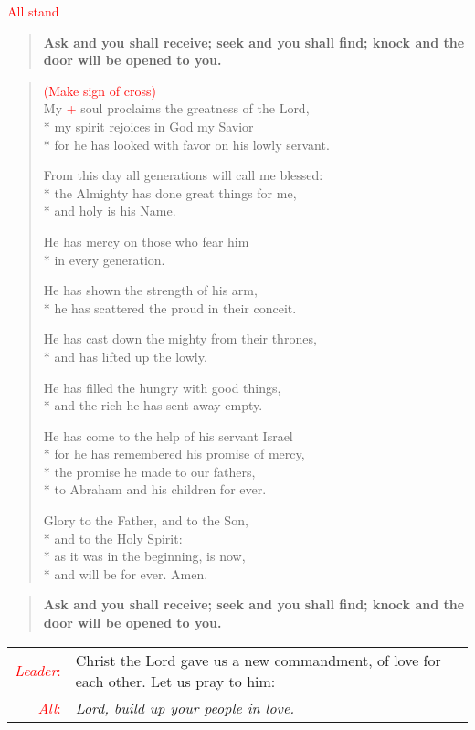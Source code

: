 \documentclass[letterpaper,14pt]{extarticle}
\newcommand{\side}[1]{\flagverse{\textcolor{red}{\textit{#1}}:}}
\newcommand{\sidestar}[1]{\textcolor{red}{\textit{#1}:}}
\newcommand{\rednote}[1]{\textcolor{red}{#1}}
\newlength{\oldindent}
\newcommand{\antiphon}[2]{
	\setlength{\oldindent}{\vindent}
	\setlength{\vindent}{0em}
	\begin{verse}
	\side{#1} \textbf{#2}
	\end{verse}
	\setlength{\vindent}{\oldindent}
}
\newcommand{\intercession}[2]{
	\begin{tabular}[h]{r p{4.25in}}
		\sidestar{Leader} & #1 \\
		\sidestar{All} & #2
	\end{tabular}}
\begin{document}
\rednote{All stand}
\antiphon{Leader}{Ask and you shall receive; seek and you shall find; knock and the door will be opened to you.}
\begin{verse}
\rednote{(Make sign of cross)}\\
\side{All} My \rednote{+} soul proclaims the greatness of the Lord, \\*
my spirit rejoices in God my Savior \\*
for he has looked with favor on his lowly servant.

From this day all generations will call me blessed: \\*
the Almighty has done great things for me, \\*
and holy is his Name.

He has mercy on those who fear him \\*
in every generation.

He has shown the strength of his arm, \\*
he has scattered the proud in their conceit.

He has cast down the mighty from their thrones, \\*
and has lifted up the lowly.

He has filled the hungry with good things, \\*
and the rich he has sent away empty.

He has come to the help of his servant Israel \\*
for he has remembered his promise of mercy, \\*
the promise he made to our fathers, \\*
to Abraham and his children for ever.

Glory to the Father, and to the Son, \\*
and to the Holy Spirit: \\*
as it was in the beginning, is now, \\*
and will be for ever. Amen.
\end{verse}
\antiphon{All}{Ask and you shall receive; seek and you shall find; knock and the door will be opened to you.}

\intercession{Christ the Lord gave us a new commandment, of love for each other. Let us pray to him:}
{\textit{Lord, build up your people in love.}}
\end{document}
